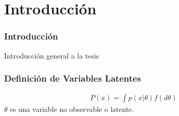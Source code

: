 \chapter{Introducci\'on}
\subsection{Introducci\'on}
Introducci\'on general a la tesis 
\subsection{Definici\'on de Variables Latentes}
\begin{align*}
P(x)=\int p(x|\theta) f(d\theta)
\end{align*}
$\theta$ es una variable no observable o latente.